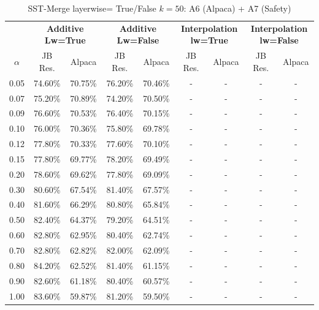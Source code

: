 \begin{table}[h]
\centering
\caption{SST-Merge layerwise= True/False $k=50$: A6 (Alpaca) + A7 (Safety)}
\label{tab:res_a6_sst_merge_50}
\begin{tabular}{c|cc|cc|cc|cc}
\hline
 & \multicolumn{2}{c|}{\textbf{Additive Lw=True}} & \multicolumn{2}{c|}{\textbf{Additive Lw=False}} & \multicolumn{2}{c|}{\textbf{Interpolation lw=True}}& \multicolumn{2}{c}{\textbf{Interpolation lw=False}} \\
$\alpha$ & JB Res. & Alpaca & JB Res. & Alpaca & JB Res. & Alpaca & JB Res. & Alpaca \\
\hline
0.05 & 74.60\% & 70.75\% & 76.20\% & 70.46\% & - & - & - & - \\
0.07 & 75.20\% & 70.89\% & 74.20\% & 70.50\% & - & - & - & - \\
0.09 & 76.60\% & 70.53\% & 76.40\% & 70.15\% & - & - & - & - \\
0.10 & 76.00\% & 70.36\% & 75.80\% & 69.78\% & - & - & - & - \\
0.12 & 77.80\% & 70.33\% & 77.60\% & 70.10\% & - & - & - & - \\
0.15 & 77.80\% & 69.77\% & 78.20\% & 69.49\% & - & - & - & - \\
0.20 & 78.60\% & 69.62\% & 77.80\% & 69.09\% & - & - & - & - \\
0.30 & 80.60\% & 67.54\% & 81.40\% & 67.57\% & - & - & - & - \\
0.40 & 81.60\% & 66.29\% & 80.80\% & 65.84\% & - & - & - & - \\
0.50 & 82.40\% & 64.37\% & 79.20\% & 64.51\% & - & - & - & - \\
0.60 & 82.80\% & 62.95\% & 80.40\% & 62.74\% & - & - & - & - \\
0.70 & 82.80\% & 62.82\% & 82.00\% & 62.09\% & - & - & - & - \\
0.80 & 84.20\% & 62.52\% & 81.40\% & 61.15\% & - & - & - & - \\
0.90 & 82.60\% & 61.18\% & 80.40\% & 60.57\% & - & - & - & - \\
1.00 & 83.60\% & 59.87\% & 81.20\% & 59.50\% & - & - & - & - \\
\hline
\end{tabular}
\end{table}
\FloatBarrier


